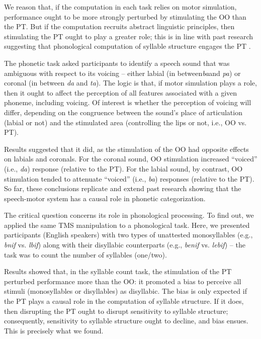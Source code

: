 \documentclass[output=paper,colorlinks,citecolor=brown
]{langscibook}
\begin{document}
We reason that, if the computation in each task relies on motor simulation, performance ought to be more strongly perturbed by stimulating the OO than the PT. But if the computation recruits abstract linguistic principles, then stimulating the PT ought to play a greater role; this is in line with past research suggesting that phonological computation of syllable structure engages the PT \citep{berent2014language}.

The phonetic task asked participants to identify a speech sound that was ambiguous with respect to its voicing -- either labial (in between\textit{ba}and \textit{pa}) or coronal (in between \textit{da} and \textit{ta}). The logic is that, if motor simulation plays a role, then it ought to affect the perception of all features associated with a given phoneme, including voicing. Of interest is whether the perception of voicing will differ, depending on the congruence between the sound’s place of articulation (labial or not) and the stimulated area (controlling the lips or not, i.e., OO vs. PT). 

Results suggested that it did, as the stimulation of the OO had opposite effects on labials and coronals. For the coronal sound, OO stimulation increased ``voiced'' (i.e., \textit{da}) response (relative to the PT). For the labial sound, by contrast, OO stimulation tended to attenuate ``voiced'' (i.e., \textit{ba}) responses (relative to the PT). So far, these conclusions replicate and extend past research showing that the speech-motor system has a causal role in phonetic categorization.

The critical question concerns its role in phonological processing. To find out, we applied the same TMS manipulation to a phonological task. Here, we presented participants (English speakers) with two types of unattested monosyllables (e.g., \textit{bnif} vs. \textit{lbif}) along with their disyllabic counterparts (e.g., \textit{benif} vs. \textit{lebif}) -- the task was to count the number of syllables (one/two). 

Results showed that, in the syllable count task, the stimulation of the PT perturbed performance more than the OO: it promoted a bias to perceive all stimuli (monosyllables or disyllables) as disyllabic. The bias is only expected if the PT plays a causal role in the computation of syllable structure. If it does, then disrupting the PT ought to disrupt sensitivity to syllable structure; consequently, sensitivity to syllable structure ought to decline, and bias ensues. This is precisely what we found.
\end{document}
